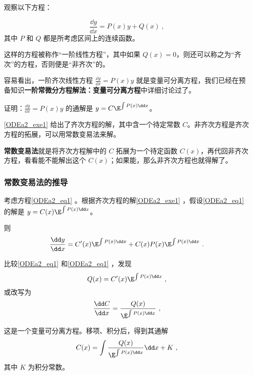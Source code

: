 

观察以下方程：

\begin{equation}\label{ODEa2_eq1}
\frac{\dd y}{\dd x}=P(x)y+Q(x)~,
\end{equation}
其中 $P$ 和 $Q$ 都是所考虑区间上的连续函数。

这样的方程被称作“一阶线性方程”，其中如果 $Q(x)=0$，则还可以称之为“齐次”的方程，否则便是“非齐次”的。

容易看出，一阶齐次线性方程 $\frac{\dd y}{\dd x}=P(x)y$ 就是变量可分离方程，我们已经在预备知识\textbf{一阶常微分方程解法：变量可分离方程}中详细讨论过了。

\begin{exercise}{}\label{ODEa2_exe1}
证明：$\frac{\dd y}{\dd x}=P(x)y$ 的通解是 $y=C\E^{\int P(x)\dd x}$。
\end{exercise}

\autoref{ODEa2_exe1} 给出了齐次方程的解，其中含一个待定常数 $C$。非齐次方程是齐次方程的拓展，可以用常数变易法来解。

\textbf{常数变易法}就是将齐次方程解中的 $C$ 拓展为一个待定函数 $C(x)$，再代回非齐次方程，看看能不能解出这个 $C(x)$；如果能，那么非齐次方程也就得解了。

\subsubsection{常数变易法的推导}
考虑方程\autoref{ODEa2_eq1} 。根据齐次方程的解\autoref{ODEa2_exe1} ，假设\autoref{ODEa2_eq1} 的解是 $y=C(x)\E^{\int P(x)\dd x}$。

则
\begin{equation}
\begin{aligned}
\frac{\dd y}{\dd x}=C'(x)\E^{\int P(x)\dd x}+C(x)P(x)\E^{\int P(x)\dd x}~.
\end{aligned}
\end{equation}

比较\autoref{ODEa2_eq1} 和\autoref{ODEa2_eq1} ，发现
\begin{equation}
Q(x)=C'(x)\E^{\int P(x)\dd x}~,
\end{equation}
或改写为
\begin{equation}
\frac{\dd C}{\dd x}=\frac{Q(x)}{\E^{\int P(x)\dd x}}~,
\end{equation}

这是一个变量可分离方程。移项、积分后，得到其通解
\begin{equation}
C(x)=\int\frac{Q(x)}{\E^{\int P(x)\dd x}}\dd x+K~,
\end{equation}
其中 $K$ 为积分常数。

